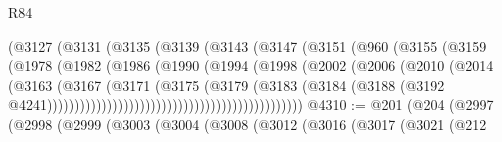 \begin{lexlean}{R84}
\begin{coremodule}
                                        (@3127
                                          (@3131
                                            (@3135
                                              (@3139
                                                (@3143
                                                  (@3147
                                                    (@3151
                                                      (@960
                                                        (@3155
                                                          (@3159
                                                            (@1978
                                                              (@1982
                                                                (@1986
                                                                  (@1990
                                                                    (@1994
                                                                      (@1998
                                                                        (@2002
                                                                          (@2006
                                                                            (@2010
                                                                              (@2014
                                                                                (@3163
                                                                                  (@3167
                                                                                    (@3171
                                                                                      (@3175
                                                                                        (@3179
                                                                                          (@3183
                                                                                            (@3184
                                                                                              (@3188
                                                                                                (@3192
                                                                                                  @4241)))))))))))))))))))))))))))))))))))))))))))))))
@4310 := @201
    (@204
      (@2997
        (@2998
          (@2999
            (@3003
              (@3004
                (@3008
                  (@3012
                    (@3016
                      (@3017
                        (@3021
                          (@212

\end{coremodule}
\end{lexlean}
